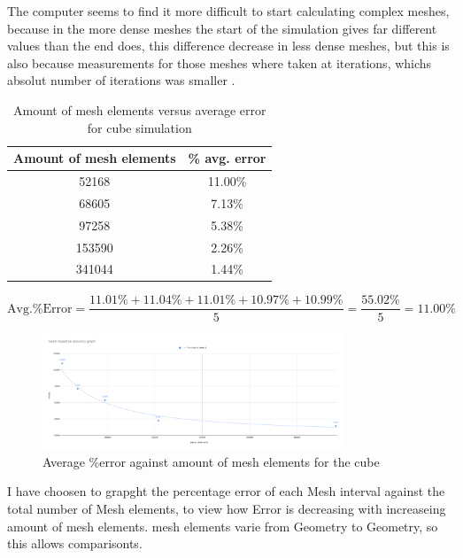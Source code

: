 \documentclass[12pt,a4paper]{article}
\begin{document}
The computer seems to find it more difficult to start calculating complex meshes, because in the more dense meshes the start of the simulation gives far different values than the end does, this difference decrease in less dense meshes, but this is also because measurements for those meshes where taken at iterations, whichs absolut number of iterations was smaller \cite{versteeg2007computational}.

\begin{table}[H]
\centering
\caption{Amount of mesh elements versus average error for cube simulation}
\label{tab:cube_elements_error}
\begin{tabular}{|c|c|}
\hline
\rowcolor{lightblue}
\textbf{Amount of mesh elements} & \textbf{\% avg. error}\\
\hline
52168 & 11.00\% \\
\hline
68605 & 7.13\% \\
\hline
97258 & 5.38\% \\
\hline
153590 & 2.26\% \\
\hline
341044 & 1.44\% \\
\hline
\end{tabular}
\end{table}

\[
\text{Avg.\% Error} = \frac{11.01\% + 11.04\% + 11.01\% + 10.97\% + 10.99\%}{5} = \frac{55.02\%}{5} = 11.00\%
\]

\begin{figure}[H]
\centering
\includegraphics[width=0.8\textwidth]{image14.png}
\caption{Average \%error against amount of mesh elements for the cube}
\label{fig:cube_elements_error}
\end{figure}

I have choosen to grapght the percentage error of each Mesh interval against the total number of Mesh elements, to view how Error is decreasing with increaseing amount of mesh elements. mesh elements varie from Geometry to Geometry, so this allows comparisonts.
\end{document}
